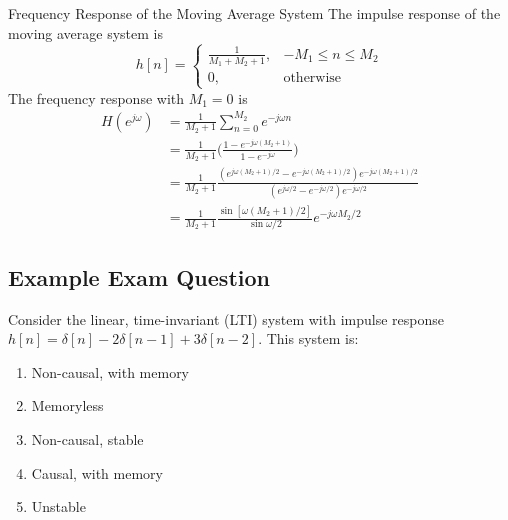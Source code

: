 \begin{ex}{Frequency Response of the Moving Average System}
The impulse response of the moving average system is
\[
    h[n] = 
    \begin{cases}
        \frac{1}{M_1+M_2+1},    & -M_1 \leq n \leq M_2 \\
        0,  & \text{otherwise}
    \end{cases} 
\]
The frequency response with $M_1=0$ is
\begin{align*}
    H(e^{j\omega}) 
    & = \frac{1}{M_2+1} \sum_{n=0}^{M_2}e^{-j\omega n} \\
    & = \frac{1}{M_2+1} \bigg( \frac{1-e^{-j\omega (M_{2}+1)}}{1-e^{-j\omega}} \bigg) \\
    & = \frac{1}{M_2+1} \frac{(e^{j\omega(M_{2}+1)/2} - e^{-j\omega(M_{2}+1)/2})e^{-j\omega(M_{2}+1)/2}}{(e^{j\omega/2}-e^{-j\omega/2})e^{-j\omega/2}} \\
    & = \frac{1}{M_2+1} \frac{\sin[\omega(M_{2}+1)/2]}{\sin \omega/2}e^{-j\omega M_{2}/2}
\end{align*}
\end{ex}

\subsection{Example Exam Question}
\begin{q}{}
Consider the linear, time-invariant (LTI) system with impulse response $h[n] = \delta[n] - 2\delta[n-1] + 3\delta[n-2]$. This system is:
\begin{enumerate}[label=(\alph*)]
    \item Non-causal, with memory
    \item Memoryless
    \item Non-causal, stable
    \item Causal, with memory
    \item Unstable
\end{enumerate}
\end{q}
